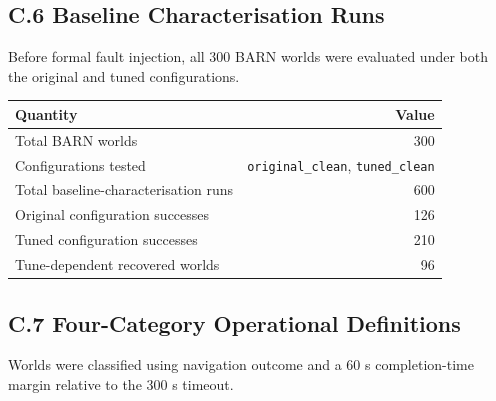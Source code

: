 \hypertarget{c.6-baseline-characterisation-runs}{%
\subsection{C.6 Baseline Characterisation Runs}\label{c.6-baseline-characterisation-runs}}

Before formal fault injection, all 300 BARN worlds were evaluated under both the original and tuned configurations.

\begin{longtable}[]{@{}lr@{}}
\toprule\noalign{}
Quantity & Value \\
\midrule\noalign{}
\endhead
\bottomrule\noalign{}
\endlastfoot
Total BARN worlds & 300 \\
Configurations tested & \texttt{original\_clean}, \texttt{tuned\_clean} \\
Total baseline-characterisation runs & 600 \\
Original configuration successes & 126 \\
Tuned configuration successes & 210 \\
Tune-dependent recovered worlds & 96 \\
\end{longtable}

\hypertarget{c.7-four-category-operational-definitions}{%
\subsection{C.7 Four-Category Operational Definitions}\label{c.7-four-category-operational-definitions}}

Worlds were classified using navigation outcome and a 60 s completion-time margin relative to the 300 s timeout.

